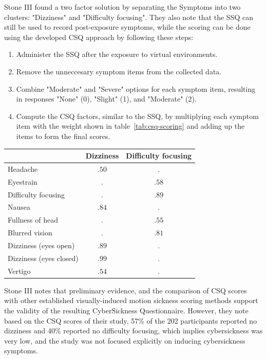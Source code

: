 Stone III found a two factor solution by separating the Symptoms into two clusters: "Dizziness" and
"Difficulty focusing".
They also note that the SSQ can still be used to record post-exposure symptoms, while the
scoring can be done using the developed CSQ approach by following these steps:
\begin{enumerate}
    \item Administer the SSQ after the exposure to virtual environments.
    \item Remove the unneccesary symptom items from the collected data.
    \item Combine "Moderate" and "Severe" options for each symptom item, resulting in responses "None" (0), "Slight"
    (1), and "Moderate" (2).
    \item Compute the CSQ factors, similar to the SSQ, by multiplying each symptom item with the weight shown in
    table~\ref{tab:csq-scoring} and adding up the items to form the final scores.
\end{enumerate}
\begin{center}
    \begin{tabular}{ l c c}
        \toprule
        \textbf{} & \textbf{Dizziness} & \textbf{Difficulty focusing} \\
        \midrule
        Headache                & $.50$ & $.$   \\
        Eyestrain               & $.$   & $.58$ \\
        Difficulty focusing     & $.$   & $.89$ \\
        Nausea                  & $.84$ & $.$   \\
        Fullness of head        & $.$   & $.55$ \\
        Blurred vision          & $.$   & $.81$ \\
        Dizziness (eyes open)   & $.89$ & $.$   \\
        Dizziness (eyes closed) & $.99$ & $.$   \\
        Vertigo                 & $.54$ & $.$   \\
        \bottomrule
    \end{tabular}
    \label{tab:csq-scoring}
\end{center}
Stone III notes that preliminary evidence, and the comparison of CSQ scores with other established visually-induced
motion sickness scoring methods support the validity of the resulting CyberSickness Questionnaire.
However, they note based on the CSQ scores of their study, 57\% of the 202 participants reported no dizziness and 40\%
reported no difficulty focusing, which implies cybersickness was very low, and the study was not focused
explicitly on inducing cybersickness symptoms.

